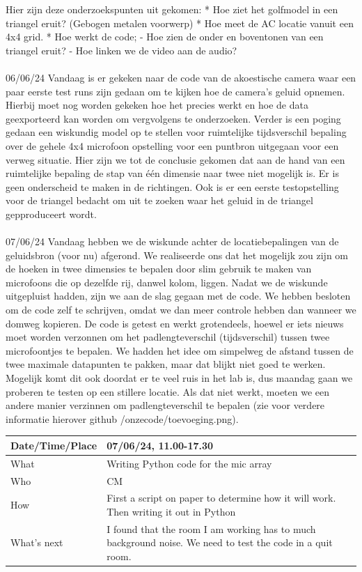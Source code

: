 \documentclass{article}
\begin{document}
Hier zijn deze onderzoekspunten uit gekomen:
    * Hoe ziet het golfmodel in een triangel eruit? (Gebogen metalen voorwerp)
    * Hoe meet de AC locatie vanuit een 4x4 grid.
    * Hoe werkt de code;
        - Hoe zien de onder en boventonen van een triangel eruit?
        - Hoe linken we de video aan de audio?\\
\\
06/06/24
Vandaag is er gekeken naar de code van de akoestische camera waar een paar eerste test runs zijn gedaan om te kijken hoe de camera's geluid opnemen. Hierbij moet nog worden gekeken hoe het precies werkt en hoe de data geexporteerd kan worden om vergvolgens te onderzoeken.
Verder is een poging gedaan een wiskundig model op te stellen voor ruimtelijke tijdsverschil bepaling over de gehele 4x4 microfoon opstelling voor een puntbron uitgegaan voor een verweg situatie. 
    Hier zijn we tot de conclusie gekomen dat aan de hand van een ruimtelijke bepaling de stap van één dimensie naar twee niet mogelijk is. Er is geen onderscheid te maken in de richtingen.
Ook is er een eerste testopstelling voor de triangel bedacht om uit te zoeken waar het geluid in de triangel gepproduceert wordt.\\
\\
07/06/24
Vandaag hebben we de wiskunde achter de locatiebepalingen van de geluidsbron (voor nu) afgerond. We realiseerde ons dat het mogelijk zou zijn om de hoeken in twee dimensies
te bepalen door slim gebruik te maken van microfoons die op dezelfde rij, danwel kolom, liggen. Nadat we de wiskunde uitgepluist hadden, zijn we aan de slag gegaan met de
code. We hebben besloten om de code zelf te schrijven, omdat we dan meer controle hebben dan wanneer we domweg kopieren. De code is getest en werkt grotendeels, hoewel er
iets nieuws moet worden verzonnen om het padlengteverschil (tijdsverschil) tussen twee microfoontjes te bepalen. We hadden het idee om simpelweg de afstand tussen de twee
maximale datapunten te pakken, maar dat blijkt niet goed te werken. Mogelijk komt dit ook doordat er te veel ruis in het lab is, dus maandag gaan we proberen te testen op
een stillere locatie. Als dat niet werkt, moeten we een andere manier verzinnen om padlengteverschil te bepalen (zie voor verdere informatie hierover github 
/onzecode/toevoeging.png).

\begin{table}[H]
\begin{tabular}{|p{1.5in}|p{4in}|}
\hline
Date/Time/Place & 07/06/24, 11.00-17.30 \\ \hline
What            & Writing Python code for the mic array \\ \hline
Who             & CM \\ \hline
How             & First a script on paper to determine how it will work. Then writing it out in Python \\ \hline
What's next     & I found that the room I am working has to much background noise. We need to test the code in a quit room. \\ \hline
\end{tabular}
\end{table}
\end{document}
